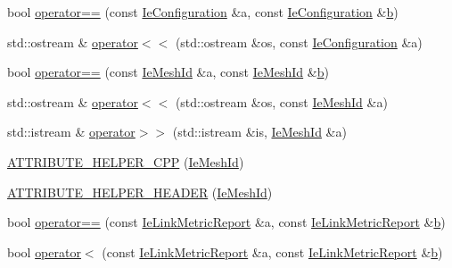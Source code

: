 \begin{DoxyCompactItemize}
\item 
bool \hyperlink{namespacens3_1_1dot11s_a288f06a242c228041c8a9c6c263fbe87}{operator==} (const \hyperlink{classns3_1_1dot11s_1_1IeConfiguration}{Ie\+Configuration} \&a, const \hyperlink{classns3_1_1dot11s_1_1IeConfiguration}{Ie\+Configuration} \&\hyperlink{lte__pathloss_8m_a21ad0bd836b90d08f4cf640b4c298e7c}{b})
\item 
std\+::ostream \& \hyperlink{namespacens3_1_1dot11s_a427f6494f33ad73c73a90846abec787d}{operator$<$$<$} (std\+::ostream \&os, const \hyperlink{classns3_1_1dot11s_1_1IeConfiguration}{Ie\+Configuration} \&a)
\item 
bool \hyperlink{namespacens3_1_1dot11s_a81b070543013e185dc5a803c4f8d53b2}{operator==} (const \hyperlink{classns3_1_1dot11s_1_1IeMeshId}{Ie\+Mesh\+Id} \&a, const \hyperlink{classns3_1_1dot11s_1_1IeMeshId}{Ie\+Mesh\+Id} \&\hyperlink{lte__pathloss_8m_a21ad0bd836b90d08f4cf640b4c298e7c}{b})
\item 
std\+::ostream \& \hyperlink{namespacens3_1_1dot11s_a105b67e6a433a9b868bd7886afc8b8ee}{operator$<$$<$} (std\+::ostream \&os, const \hyperlink{classns3_1_1dot11s_1_1IeMeshId}{Ie\+Mesh\+Id} \&a)
\item 
std\+::istream \& \hyperlink{namespacens3_1_1dot11s_a3cddae596a4a40875df7df27ed1e1f71}{operator$>$$>$} (std\+::istream \&is, \hyperlink{classns3_1_1dot11s_1_1IeMeshId}{Ie\+Mesh\+Id} \&a)
\item 
\hyperlink{namespacens3_1_1dot11s_aa5294864a5ca39146b5c5a4c0e0bc4ef}{A\+T\+T\+R\+I\+B\+U\+T\+E\+\_\+\+H\+E\+L\+P\+E\+R\+\_\+\+C\+PP} (\hyperlink{classns3_1_1dot11s_1_1IeMeshId}{Ie\+Mesh\+Id})
\item 
\hyperlink{namespacens3_1_1dot11s_a1bc0beac2c6dcfdcc01314c184deaec9}{A\+T\+T\+R\+I\+B\+U\+T\+E\+\_\+\+H\+E\+L\+P\+E\+R\+\_\+\+H\+E\+A\+D\+ER} (\hyperlink{classns3_1_1dot11s_1_1IeMeshId}{Ie\+Mesh\+Id})
\item 
bool \hyperlink{namespacens3_1_1dot11s_a791fd928325c7f4c38a4130951fc3abf}{operator==} (const \hyperlink{classns3_1_1dot11s_1_1IeLinkMetricReport}{Ie\+Link\+Metric\+Report} \&a, const \hyperlink{classns3_1_1dot11s_1_1IeLinkMetricReport}{Ie\+Link\+Metric\+Report} \&\hyperlink{lte__pathloss_8m_a21ad0bd836b90d08f4cf640b4c298e7c}{b})
\item 
bool \hyperlink{namespacens3_1_1dot11s_a712de4d131042d7602f9bac0f5bd8460}{operator$<$} (const \hyperlink{classns3_1_1dot11s_1_1IeLinkMetricReport}{Ie\+Link\+Metric\+Report} \&a, const \hyperlink{classns3_1_1dot11s_1_1IeLinkMetricReport}{Ie\+Link\+Metric\+Report} \&\hyperlink{lte__pathloss_8m_a21ad0bd836b90d08f4cf640b4c298e7c}{b})

\end{DoxyCompactItemize}
